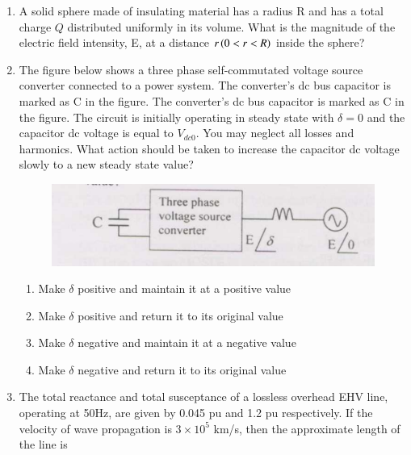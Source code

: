 \documentclass[journal]{IEEEtran}
\begin{document}
\begin{enumerate}
\begin{enumerate}
\end{enumerate}
\bigskip
\item A solid sphere made of insulating material has a radius R and has a total charge $Q$ distributed uniformly in its volume. What is the magnitude of the electric field intensity, E, at a distance $r\left(0<r<R\right)$ inside the sphere?
\begin{enumerate}
\end{enumerate}
\bigskip
\item The figure below shows a three phase self-commutated voltage source converter connected to a power system. The converter's dc bus capacitor is marked as C in the figure. The converter's dc bus capacitor is marked as C in the figure. The circuit is initially operating in steady state with $\delta=0$ and the capacitor dc voltage is equal to $V_{dc0}$. You may neglect all losses and harmonics. What action should be taken to increase the capacitor dc voltage slowly to a new steady state value?
\begin{figure}[H]
   \centering
   \includegraphics[width=0.7\linewidth]{figs/fig_5.png}
   \label{stemplot}
\end{figure}
\begin{enumerate}
        \item Make $\delta$ positive and maintain it at a positive value
        \item Make $\delta$ positive and return it to its original value
        \item Make $\delta$ negative and maintain it at a negative value
        \item Make $\delta$ negative and return it to its original value
\end{enumerate}
\bigskip
\item The total reactance and total susceptance of a lossless overhead EHV line, operating at 50Hz, are given by 0.045 pu and 1.2 pu respectively. If the velocity of wave propagation is $3 \times 10^5$ km/s, then the approximate length of the line is

\end{enumerate}
\end{document}
